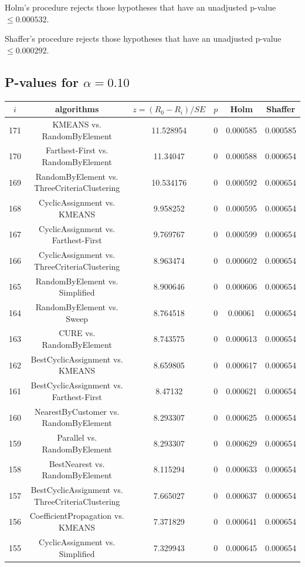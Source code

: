 \documentclass[a4paper,10pt]{article}
\begin{document}
\begin{landscape}
Holm's procedure rejects those hypotheses that have an unadjusted p-value $\le0.000532$.

Shaffer's procedure rejects those hypotheses that have an unadjusted p-value $\le0.000292$.

\pagebreak

\subsection{P-values for $\alpha=0.10$}

\begin{table}[!htp]
\centering\scriptsize
\begin{tabular}{cccccc}
$i$&algorithms&$z=(R_0 - R_i)/SE$&$p$&Holm&Shaffer\\
\hline171&KMEANS vs. RandomByElement&11.528954&0&0.000585&0.000585\\
170&Farthest-First vs. RandomByElement&11.34047&0&0.000588&0.000654\\
169&RandomByElement vs. ThreeCriteriaClustering&10.534176&0&0.000592&0.000654\\
168&CyclicAssignment vs. KMEANS&9.958252&0&0.000595&0.000654\\
167&CyclicAssignment vs. Farthest-First&9.769767&0&0.000599&0.000654\\
166&CyclicAssignment vs. ThreeCriteriaClustering&8.963474&0&0.000602&0.000654\\
165&RandomByElement vs. Simplified&8.900646&0&0.000606&0.000654\\
164&RandomByElement vs. Sweep&8.764518&0&0.00061&0.000654\\
163&CURE vs. RandomByElement&8.743575&0&0.000613&0.000654\\
162&BestCyclicAssignment vs. KMEANS&8.659805&0&0.000617&0.000654\\
161&BestCyclicAssignment vs. Farthest-First&8.47132&0&0.000621&0.000654\\
160&NearestByCustomer vs. RandomByElement&8.293307&0&0.000625&0.000654\\
159&Parallel vs. RandomByElement&8.293307&0&0.000629&0.000654\\
158&BestNearest vs. RandomByElement&8.115294&0&0.000633&0.000654\\
157&BestCyclicAssignment vs. ThreeCriteriaClustering&7.665027&0&0.000637&0.000654\\
156&CoefficientPropagation vs. KMEANS&7.371829&0&0.000641&0.000654\\
155&CyclicAssignment vs. Simplified&7.329943&0&0.000645&0.000654\\

\end{tabular}
\end{table}
\end{landscape}
\end{document}
